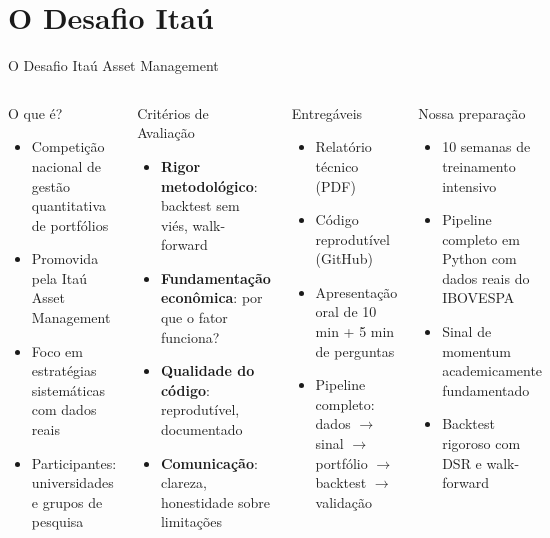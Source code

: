\documentclass[aspectratio=169,12pt]{beamer}
\begin{document}
\section{O Desafio Itaú}
\begin{frame}[fragile]{O Desafio Itaú Asset Management}
\begin{columns}[T]
\begin{block}{O que é?}
\begin{itemize}
  \item Competição nacional de gestão quantitativa de portfólios
  \item Promovida pela Itaú Asset Management
  \item Foco em estratégias sistemáticas com dados reais
  \item Participantes: universidades e grupos de pesquisa
\end{itemize}
\end{block}
\vspace{.3em}
\begin{block}{Critérios de Avaliação}
\begin{itemize}
  \item \textbf{Rigor metodológico}: backtest sem viés, walk-forward
  \item \textbf{Fundamentação econômica}: por que o fator funciona?
  \item \textbf{Qualidade do código}: reprodutível, documentado
  \item \textbf{Comunicação}: clareza, honestidade sobre limitações
\end{itemize}
\end{block}
\begin{block}{Entregáveis}
\begin{itemize}
  \item Relatório técnico (PDF)
  \item Código reprodutível (GitHub)
  \item Apresentação oral de 10 min + 5 min de perguntas
  \item Pipeline completo: dados $\to$ sinal $\to$ portfólio $\to$ backtest $\to$ validação
\end{itemize}
\end{block}
\vspace{.3em}
\begin{exampleblock}{Nossa preparação}
\begin{itemize}
  \item 10 semanas de treinamento intensivo
  \item Pipeline completo em Python com dados reais do IBOVESPA
  \item Sinal de momentum academicamente fundamentado
  \item Backtest rigoroso com DSR e walk-forward
\end{itemize}
\end{exampleblock}
\end{columns}
\end{frame}
\end{document}
